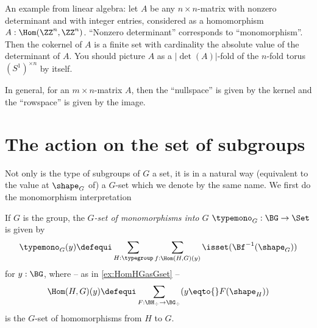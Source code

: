 
\begin{example}
  An example from linear algebra: let $A$ be any $n\times n$-matrix with nonzero determinant and with integer entries, considered as a homomorphism $A:\Hom(\ZZ^n,\ZZ^n)$. ``Nonzero determinant'' corresponds to ``monomorphism''.  Then the cokernel of $A$ is a finite set with cardinality the absolute value of the determinant of $A$.  You should picture $A$ as a $|\det(A)|$-fold \covering of the $n$-fold torus $(S^1)^{\times n}$ by itself.

  In general, for an $m\times n$-matrix $A$, then the ``nullspace'' is given by the kernel and the ``rowspace'' is given by the image.
\end{example}


\section{The action on the set of subgroups}
\label{sec:actiononsub}

Not only is the type of subgroups  of $G$ a set, it is in a natural way (equivalent to the value at $\shape_G$ of) a $G$-set which we denote by the same name.  We first do the monomorphism interpretation
\begin{definition}
  If $G$ is the group, the \emph{$G$-set of monomorphisms into $G$} $\typemono_G:\BG\to\Set$ is given by
  $$%
  \typemono_G(y)\defequi \sum_{H:\typegroup}\sum_{f:\Hom(H,G)(y)}\isset(\Bf^{-1}(\shape_G))$$
  for $y:\BG$,
where  -- as in \cref{ex:HomHGasGset} --
$$\Hom(H,G)(y)\defequi\sum_{F:\BH_\div\to \BG_\div}(y\eqto{}F(\shape_H))$$
is the $G$-set of homomorphisms from $H$ to $G$.
\end{definition}

